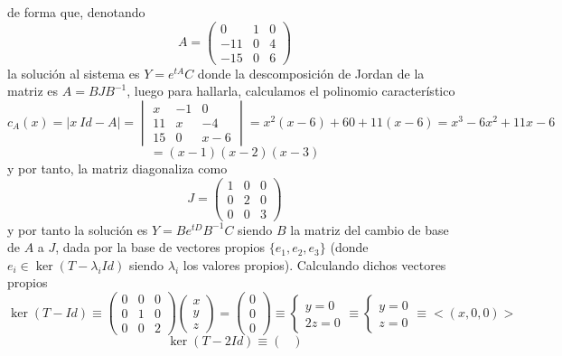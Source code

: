 \begin{enumerate}
\begin{sol}
    de forma que, denotando
    $$A=\begin{pmatrix}
        0 & 1 & 0 \\
        -11 & 0 & 4 \\
        -15 & 0 & 6
    \end{pmatrix}$$
    la solución al sistema es $Y=e^{tA} C$ donde la descomposición de Jordan de la matriz es $A=B J B^{-1}$, luego para hallarla, calculamos el polinomio característico
    $$c_A(x)=|x \: Id- A|=\begin{vmatrix}
        x & -1 & 0 \\
        11 & x & -4 \\
        15 & 0 & x-6
    \end{vmatrix}=x^2(x-6)+60+11(x-6)=x^3-6x^2+11x-6$$
    $$=(x-1)(x-2)(x-3)$$
    y por tanto, la matriz diagonaliza como
    $$J=\begin{pmatrix}
        1 & 0 & 0 \\
        0 & 2 & 0 \\
        0 & 0 & 3
    \end{pmatrix}$$
    y por tanto la solución es $Y=B e^{tD} B^{-1} C$ siendo $B$ la matriz del cambio de base de $A$ a $J$, dada por la base de vectores propios $\{e_1, e_2, e_3\}$ (donde $e_i \in \ker(T-\lambda_i Id)$ siendo $\lambda_i$ los valores propios). Calculando dichos vectores propios
    $$\ker (T-Id) \equiv \begin{pmatrix}
        0 & 0 & 0 \\
        0 & 1 & 0 \\
        0 & 0 & 2
    \end{pmatrix}\begin{pmatrix}
        x \\ y \\ z
    \end{pmatrix}=\begin{pmatrix}
        0 \\ 0 \\ 0
    \end{pmatrix} \equiv \left\{ \begin{array}{l}
         y=0  \\
          2z=0
    \end{array} \right. \equiv \left\{ \begin{array}{l}
         y=0  \\
         z=0
    \end{array} \right.  \equiv <(x,0,0)>$$
    $$\ker (T-2Id) \equiv\begin{pmatrix}

\end{pmatrix}$$
\end{sol}
\end{enumerate}
